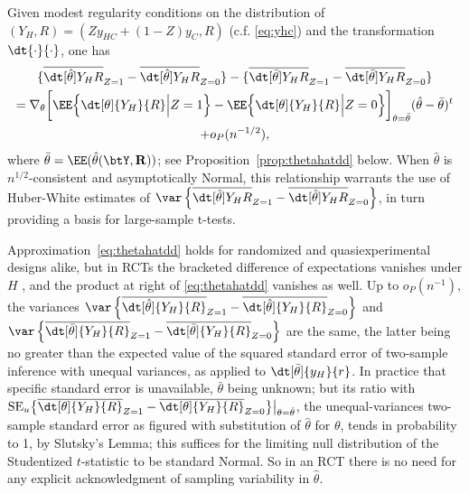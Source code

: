 Given modest regularity conditions on the distribution of
$( Y_{H}, R) = (Z y_{HC} + (1-Z) y_{C}, R)$ (c.f. \eqref{eq:yhc})  and the
transformation $\dt{\cdot }{ \cdot}$, one has
\begin{multline}   \label{eq:thetahatdd}
 \{ \overline{\dt[\hat{\theta}]{Y_{H} }{ {R}}}_{Z=1} -
\overline{\dt[\hat{\theta}]{Y_{H} }{ {R}}}_{Z=0} \} -
\{  \overline{\dt[\bar{\theta} ]{ Y_{H} }{ {R}}}_{Z=1} -
\overline{\dt[\bar{\theta}]{ Y_{H} }{ {R}}}_{Z=0}  \}   \\=
\nabla_{\theta} \bigg[ \EE \Big\{
\dt[\theta]{{{Y}_H} }{ {R}}
\Big| Z=1\Big\}   - \EE \Big\{
\dt[\theta]{{{Y}_H} }{ {R}}
\Big| Z=0\Big\} \bigg]_{\theta=\bar\theta}  (\hat\theta - \bar\theta)^{t}  \\ + o_{P}(n^{-1/2}),
\end{multline}
where $\bar\theta = \EE(\hat\theta({\btY}, \mathbf{R}))$;
see Proposition~\ref{prop:thetahatdd} below.   When $\hat\theta$ is
$n^{1/2}$-consistent and asymptotically Normal, this relationship
warrants the use of Huber-White estimates of
$\var\left\{\overline{\dt[\hat{\theta}]{Y_{H} }{ {R}}}_{Z=1} -
\overline{\dt[\hat{\theta}]{Y_{H} }{ {R}}}_{Z=0}\right\}$,
in turn providing a basis for large-sample t-tests.

Approximation~\eqref{eq:thetahatdd} holds for randomized and
quasiexperimental designs alike, but in RCTs the bracketed difference
of expectations vanishes under $H$
\citep{bowers:hans:2008,lin2013agnostic,lin2013agnosticSupp}, and the
product at right of \eqref{eq:thetahatdd} vanishes as well. Up to
$o_{P}(n^{-1})$, the variances
$\var \left\{ \overline{\dt[\hat\theta]{{Y_H} }{ R}}_{Z=1} -
  \overline{\dt[\hat\theta]{{Y_H}}{ R}}_{Z=0} \right\} $
and
$\var \left\{ \overline{\dt[\bar\theta]{{Y_H} }{ R}}_{Z=1} -
  \overline{\dt[\bar\theta]{{Y_H}}{ R}}_{Z=0} \right\}$
are the same, the latter being no greater than the expected value of
the squared standard error of two-sample inference with unequal
variances, as applied to
$\dt[\bar\theta]{{y_H} }{ r}$.  In practice that specific standard error
is unavailable, $\bar\theta$ being unknown; but its ratio with
$\mathrm{SE}_{u}\big\{ \overline{\dt[\theta]{{Y_H} }{ R}}_{Z=1} -
\overline{\dt[\theta]{{Y_H}}{ R}}_{Z=0} \big\} \big|_{\theta =
  \hat{\theta}}$, the unequal-variances two-sample standard error as figured with 
substitution of $\hat\theta$ for $\theta$, tends in probability to 1, 
by Slutsky's Lemma;
this suffices for the limiting null
distribution of the Studentized $t$-statistic to be standard Normal.
So in an RCT there is no need for any
explicit acknowledgment of sampling variability in $\hat\theta$.

